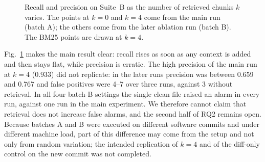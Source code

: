 \documentclass[12pt,onecolumn,draftclsnofoot]{IEEEtran}
\begin{document}
\begin{figure}[!t]
\centering
{}
\caption{Recall and precision on Suite~B as the number of retrieved chunks $k$ varies. The points at $k=0$ and $k=4$ come from the main run (batch A); the others come from the later ablation run (batch B). The BM25 points are drawn at $k=4$.}\label{fig:trend}
\end{figure}

Fig.~\ref{fig:trend} makes the main result clear: recall rises as soon as any context is added and then stays flat, while precision is erratic. The high precision of the main run at $k=4$ ($0.933$) did not replicate: in the later runs precision was between 0.659 and 0.767 and false positives were 4--7 over three runs, against 3 without retrieval. In all four batch-B settings the single clean file raised an alarm in every run, against one run in the main experiment. We therefore cannot claim that retrieval does not increase false alarms, and the second half of RQ2 remains open. Because batches A and B were executed on different software commits and under different machine load, part of this difference may come from the setup and not only from random variation; the intended replication of $k=4$ and of the diff-only control on the new commit was not completed.
\end{document}
